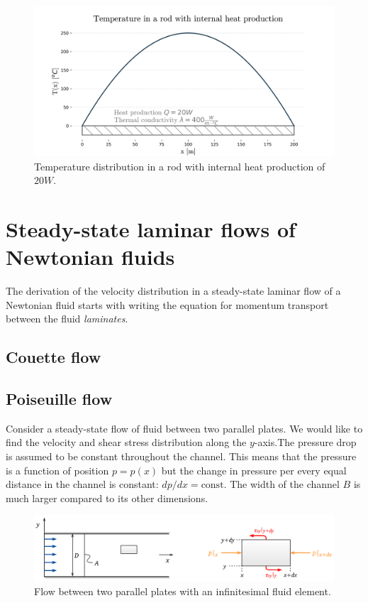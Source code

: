\documentclass[10pt]{article}
\begin{document}
\begin{figure}[H]
\centering\includegraphics[width=16cm]{Code/conduction-rod.png}
\caption{Temperature distribution in a rod with internal heat production of $20 W$.}
\label{fig:python_graph}
\end{figure}

\newpage

\section{Steady-state laminar flows of Newtonian fluids}

The derivation of the velocity distribution in a steady-state laminar flow of a Newtonian fluid starts with writing the equation for momentum transport between the fluid \textit{laminates}.

\subsection{Couette flow}


\subsection{Poiseuille flow}

Consider a steady-state flow of fluid between two parallel plates. We would like to find the velocity and shear stress distribution along the $y$-axis.The pressure drop is assumed to be constant throughout the channel. This means that the pressure is a function of position $p = p(x)$ but the change in pressure per every equal distance in the channel is constant: $dp/dx = \text{const}$. The width of the channel $B$ is much larger compared to its other dimensions.

\begin{figure}[H]
\centering\includegraphics[width=15cm]{plots/poiseuille-fluid-element.png}
\caption{Flow between two parallel plates with an infinitesimal fluid element.}			
\label{fig:poiseuille-fluid-element}
\end{figure}
\end{document}
